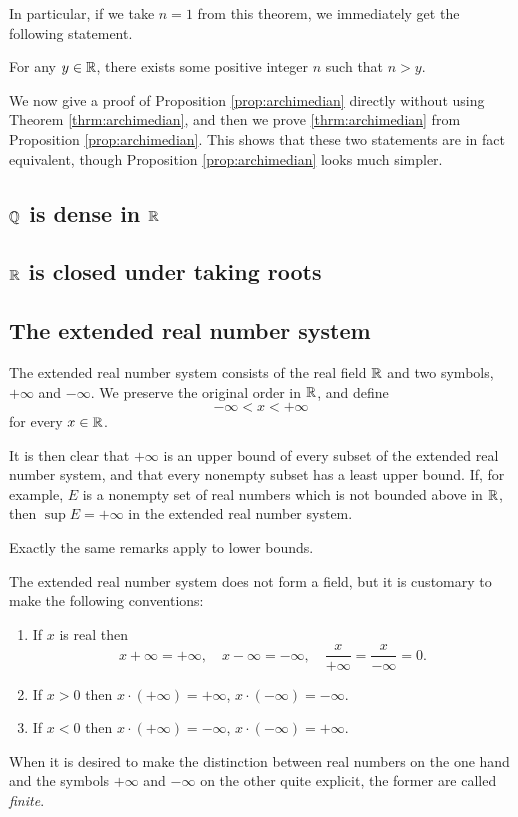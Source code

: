 In particular, if we take $n=1$ from this theorem, we immediately get the following statement.

\begin{proposition}\label{prop:archimedian}
For any $y\in\mathbb R$, there exists some positive integer $n$ such that $n>y$.
\end{proposition}

We now give a proof of Proposition \ref{prop:archimedian} directly without using Theorem \ref{thrm:archimedian}, and then we prove \ref{thrm:archimedian} from Proposition \ref{prop:archimedian}. This shows that these two statements are in fact equivalent, though Proposition \ref{prop:archimedian} looks much simpler.

\subsection{$\mathbb Q$ is dense in $\mathbb R$}

\subsection{$\mathbb R$ is closed under taking roots}

\subsection{The extended real number system}
\begin{definition}
The extended real number system consists of the real field $\mathbb R$ and two symbols, $+\infty$ and $-\infty$. We preserve the original order in $\mathbb R$, and define
\[ -\infty<x<+\infty \]
for every $x\in\mathbb R$.
\end{definition}

It is then clear that $+\infty$ is an upper bound of every subset of the extended real number system, and that every nonempty subset has a least upper bound. If, for example, $E$ is a nonempty set of real numbers which is not bounded above in $\mathbb R$, then $\sup E=+\infty$ in the extended real number system.

Exactly the same remarks apply to lower bounds.

The extended real number system does not form a field, but it is customary to make the following conventions:
\begin{enumerate}[label=(\arabic*)]
\item If $x$ is real then
\[ x+\infty=+\infty, \quad x-\infty=-\infty, \quad \frac{x}{+\infty}=\frac{x}{-\infty}=0. \]
\item If $x>0$ then $x\cdot(+\infty)=+\infty$, $x\cdot(-\infty)=-\infty$.
\item If $x<0$ then $x\cdot(+\infty)=-\infty$, $x\cdot(-\infty)=+\infty$.
\end{enumerate}
When it is desired to make the distinction between real numbers on the one hand and the symbols $+\infty$ and $-\infty$ on the other quite explicit, the former are called \emph{finite}.
\pagebreak

